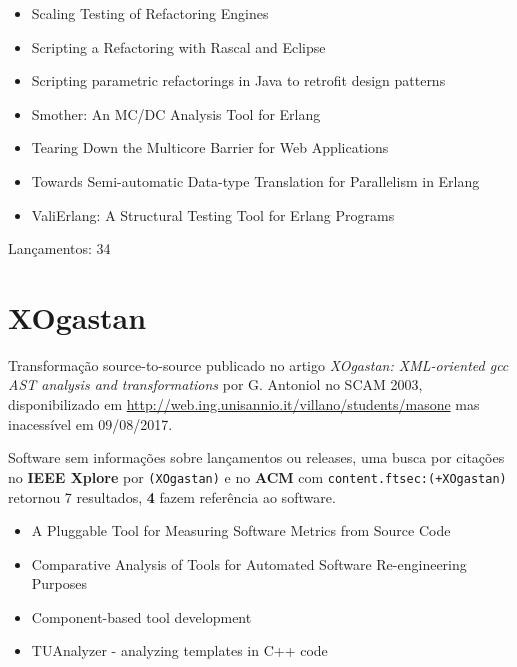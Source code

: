 \begin{itemize}
\item Scaling Testing of Refactoring Engines
\item Scripting a Refactoring with Rascal and Eclipse
\item Scripting parametric refactorings in Java to retrofit design patterns
\item Smother: An MC/DC Analysis Tool for Erlang
\item Tearing Down the Multicore Barrier for Web Applications
\item Towards Semi-automatic Data-type Translation for Parallelism in Erlang
\item ValiErlang: A Structural Testing Tool for Erlang Programs
\end{itemize}

Lançamentos: 34

\section{XOgastan}

Transformação source-to-source
publicado no artigo {\it XOgastan: XML-oriented gcc AST analysis and transformations}
por G. Antoniol
no SCAM 2003,
disponibilizado em \url{http://web.ing.unisannio.it/villano/students/masone}
mas inacessível em 09/08/2017.

Software sem informações sobre lançamentos ou releases,
uma busca por citações no {\bf IEEE Xplore} por
\texttt{(XOgastan)}
e no {\bf ACM} com
\texttt{content.ftsec:(+XOgastan)}
retornou
7 resultados,
{\bf 4} fazem referência ao software.

\begin{itemize}
\item A Pluggable Tool for Measuring Software Metrics from Source Code
\item Comparative Analysis of Tools for Automated Software Re-engineering Purposes
\item Component-based tool development
\item TUAnalyzer - analyzing templates in C++ code
\end{itemize}



